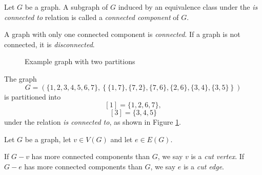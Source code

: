\begin{defn}
    Let $G$ be a graph. A subgraph of $G$ induced by an equivalence class under the \emph{is connected to} relation is called a \emph{connected component} of $G$.
\end{defn}

\begin{defn}
    A graph with only one connected component is \emph{connected}. If a graph is not connected, it is \emph{disconnected}.
\end{defn}

\begin{figure}[ht!]
    \centering
\caption{Example graph with two partitions}
\label{fig:partition-graph-example}
\end{figure}

\begin{exmp}
    The graph
    \[G = (\{1, 2, 3, 4, 5, 6, 7\}, \left\{\{1, 7\}, \{7, 2\}, \{7, 6\}, \{2, 6\}, \{3, 4\}, \{3, 5\}\right\})\]
    is partitioned into
    \[[1] = \{1, 2, 6, 7\},\]
    \[[3] = \{3, 4, 5\}\] under the relation \emph{is connected to}, as shown in Figure \ref{fig:partition-graph-example}.
\end{exmp}

\begin{defn}
    Let $G$ be a graph, let $v \in V(G)$ and let $e \in E(G)$.

    If $G - v$ has more connected components than $G$, we say $v$ is a \emph{cut vertex}. If $G - e$ has more connected components than $G$, we say $e$ is a \emph{cut edge}.
\end{defn}

